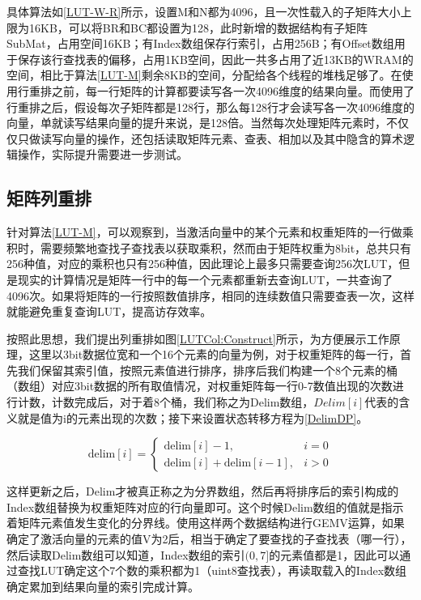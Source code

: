 具体算法如\ref{LUT-W-R}所示，设置M和N都为4096，且一次性载入的子矩阵大小上限为16KB，可以将BR和BC都设置为128，此时新增的数据结构有子矩阵SubMat，占用空间16KB；有Index数组保存行索引，占用256B；有Offset数组用于保存该行查找表的偏移，占用1KB空间，因此一共多占用了近13KB的WRAM的空间，相比于算法\ref{LUT-M}剩余8KB的空间，分配给各个线程的堆栈足够了。在使用行重排之前，每一行矩阵的计算都要读写各一次4096维度的结果向量。而使用了行重排之后，假设每次子矩阵都是128行，那么每128行才会读写各一次4096维度的向量，单就读写结果向量的提升来说，是128倍。当然每次处理矩阵元素时，不仅仅只做读写向量的操作，还包括读取矩阵元素、查表、相加以及其中隐含的算术逻辑操作，实际提升需要进一步测试。

\subsection{矩阵列重排}
针对算法\ref{LUT-M}，可以观察到，当激活向量中的某个元素和权重矩阵的一行做乘积时，需要频繁地查找子查找表以获取乘积，然而由于矩阵权重为8bit，总共只有256种值，对应的乘积也只有256种值，因此理论上最多只需要查询256次LUT，但是现实的计算情况是矩阵一行中的每一个元素都重新去查询LUT，一共查询了4096次。如果将矩阵的一行按照数值排序，相同的连续数值只需要查表一次，这样就能避免重复查询LUT，提高访存效率。

按照此思想，我们提出列重排如图\ref{LUTCol:Construct}所示，为方便展示工作原理，这里以3bit数据位宽和一个16个元素的向量为例，对于权重矩阵的每一行，首先我们保留其索引值，按照元素值进行排序，排序后我们构建一个8个元素的桶（数组）对应3bit数据的所有取值情况，对权重矩阵每一行0-7数值出现的次数进行计数，计数完成后，对于着8个桶，我们称之为Delim数组，$Delim[i]$代表的含义就是值为i的元素出现的次数；接下来设置状态转移方程为\ref{DelimDP}。

\begin{equation}
    \text{delim}[i] = \begin{cases}
        \text{delim}[i] - 1, & i = 0 \\
        \text{delim}[i] + \text{delim}[i - 1], & i > 0
    \end{cases}
    \label{DelimDP}
\end{equation}

这样更新之后，Delim才被真正称之为分界数组，然后再将排序后的索引构成的Index数组替换为权重矩阵对应的行向量即可。这个时候Delim数组的值就是指示着矩阵元素值发生变化的分界线。使用这样两个数据结构进行GEMV运算，如果确定了激活向量的元素的值V为2后，相当于确定了要查找的子查找表（哪一行），然后读取Delim数组可以知道，Index数组的索引$(0,7]$的元素值都是1，因此可以通过查找LUT确定这个7个数的乘积都为1（uint8查找表），再读取载入的Index数组确定累加到结果向量的索引完成计算。

